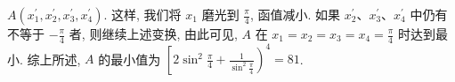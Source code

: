 $A\left(x_1^{\prime}, x_2^{\prime}, x_3^{\prime}, x_4^{\prime}\right)$.
这样, 我们将 $x_1$ 磨光到 $\frac{\pi}{4}$, 函值减小.
如果 $x_2^{\prime} 、 x_3^{\prime} 、 x_4^{\prime}$ 中仍有不等于 $-\frac{\pi}{4}$ 者, 则继续上述变换, 由此可见, $A$ 在 $x_1=x_2=x_3=x_4=\frac{\pi}{4}$ 时达到最小.
综上所述, $A$ 的最小值为 $\left[2 \sin ^2 \frac{\pi}{4}+\frac{1}{\sin ^2 \frac{\pi}{4}}\right)^4=81$.


